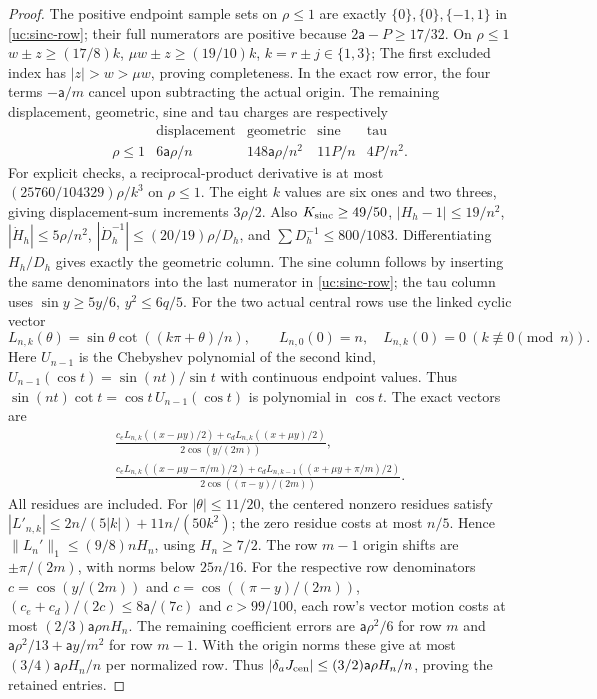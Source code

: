 \begin{proof}
The positive endpoint sample sets on $\rho\leq1$ are exactly
$\{0\},\{0\},\{-1,1\}$ in \eqref{uc:sinc-row}; their full
numerators are positive because $2\mathsf{a}-P\geq17/32$. On $\rho\leq1$
$w\pm z\geq(17/8)k$, $\mu w\pm z\geq(19/10)k$,
$k=r\pm j\in\{1,3\}$;
The first excluded index has $|z|>w>\mu w$, proving completeness.
In the exact row error, the four terms $-\mathsf{a}/m$ cancel upon subtracting
the actual origin. The remaining displacement, geometric, sine and
tau charges are respectively
\[
\begin{array}{ccccc}
 &\text{displacement}&\text{geometric}&\text{sine}&\text{tau}\\ \hline
\rho\leq1&6\mathsf{a}\rho/n&148\mathsf{a}\rho/n^2&11P/n&4P/n^2.
\end{array}
\]
For explicit checks, a reciprocal-product derivative is at most
$(25760/104329)\rho/k^3$ on $\rho\leq1$. The eight $k$ values
are six ones and two threes, giving displacement-sum increments
$3\rho/2$. Also
$K_{\rm sinc}\geq49/50$, $|H_h-1|\leq19/n^2$, $|\dot H_h|\leq5\rho/n^2$,
$|\dot D_h^{-1}|\leq(20/19)\rho/D_h$, and
$\sum D_h^{-1}\leq800/1083$.
Differentiating $H_h/D_h$ gives exactly the geometric column.
The sine column follows by inserting the same denominators into the
last numerator in \eqref{uc:sinc-row}; the tau column uses
$\sin y\geq5y/6$, $y^2\leq6q/5$.
For the two actual central rows use the linked cyclic vector
\[
 L_{n,k}(\theta)=\sin\theta\cot((k\pi+\theta)/n),\qquad
 L_{n,0}(0)=n,\quad L_{n,k}(0)=0\ (k\not\equiv0\pmod n).
\]
Here $U_{n-1}$ is the Chebyshev polynomial of the second kind,
$U_{n-1}(\cos t)=\sin(nt)/\sin t$ with continuous endpoint values.
Thus $\sin(nt)\cot t=\cos t\,U_{n-1}(\cos t)$ is polynomial in $\cos t$.
The exact vectors are
\[
 \begin{gathered}
 \frac{c_eL_{n,k}((x-\mu y)/2)+c_dL_{n,k}((x+\mu y)/2)}
                {2\cos(y/(2m))},\\
 \frac{c_eL_{n,k}((x-\mu y-\pi/m)/2)
             +c_dL_{n,k-1}((x+\mu y+\pi/m)/2)}
                {2\cos((\pi-y)/(2m))}.
 \end{gathered}
\]
All residues are included. For $|\theta|\leq11/20$, the centered
nonzero residues satisfy
$|L'_{n,k}|\leq2n/(5|k|)+11n/(50k^2)$; the zero residue costs
at most $n/5$. Hence $\|L_n'\|_1\leq(9/8)nH_n$, using
$H_n\geq7/2$. The row $m-1$ origin shifts are $\pm\pi/(2m)$,
with norms below $25n/16$. For the respective row denominators
$c=\cos(y/(2m))$ and $c=\cos((\pi-y)/(2m))$,
$(c_e+c_d)/(2c)\leq8\mathsf{a}/(7c)$ and $c>99/100$, each row's vector
motion costs at most $(2/3)\mathsf{a}\rho nH_n$.
The remaining coefficient errors are $\mathsf{a}\rho^2/6$ for row $m$ and
$\mathsf{a}\rho^2/13+\mathsf{a}y/m^2$ for row $m-1$. With the origin norms these
give at most $(3/4)\mathsf{a}\rho H_n/n$ per normalized row.
Thus $|\delta_aJ_{\rm cen}|\leq(3/2)\mathsf{a}\rho H_n/n$, proving the
retained entries.


\end{proof}
